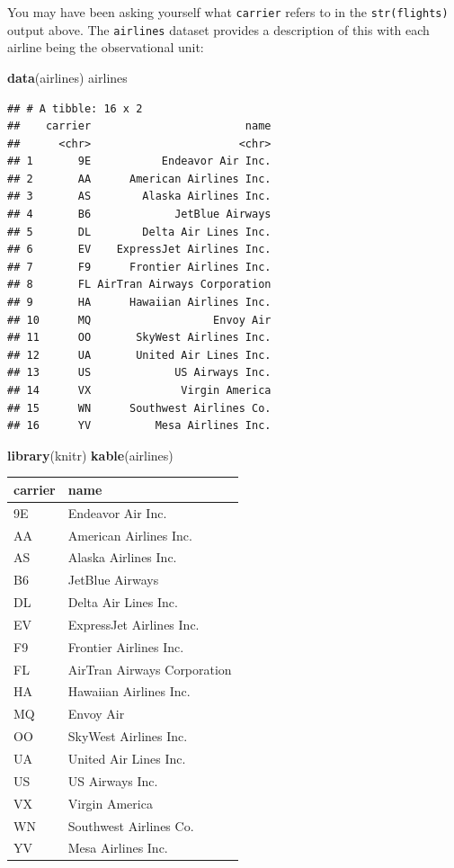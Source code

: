 \documentclass[]{tufte-book}
\newenvironment{Shaded}{\begin{snugshade}}{\end{snugshade}}
\newcommand{\KeywordTok}[1]{\textcolor[rgb]{0.13,0.29,0.53}{\textbf{{#1}}}}
\newcommand{\NormalTok}[1]{{#1}}
\begin{document}
You may have been asking yourself what \texttt{carrier} refers to in the
\texttt{str(flights)} output above. The \texttt{airlines} dataset
provides a description of this with each airline being the observational
unit:

\begin{Shaded}
\begin{Highlighting}[]
\KeywordTok{data}\NormalTok{(airlines)}
\NormalTok{airlines}
\end{Highlighting}
\end{Shaded}

\begin{verbatim}
## # A tibble: 16 x 2
##    carrier                        name
##      <chr>                       <chr>
## 1       9E           Endeavor Air Inc.
## 2       AA      American Airlines Inc.
## 3       AS        Alaska Airlines Inc.
## 4       B6             JetBlue Airways
## 5       DL        Delta Air Lines Inc.
## 6       EV    ExpressJet Airlines Inc.
## 7       F9      Frontier Airlines Inc.
## 8       FL AirTran Airways Corporation
## 9       HA      Hawaiian Airlines Inc.
## 10      MQ                   Envoy Air
## 11      OO       SkyWest Airlines Inc.
## 12      UA       United Air Lines Inc.
## 13      US             US Airways Inc.
## 14      VX              Virgin America
## 15      WN      Southwest Airlines Co.
## 16      YV          Mesa Airlines Inc.
\end{verbatim}

\begin{Shaded}
\begin{Highlighting}[]
\KeywordTok{library}\NormalTok{(knitr)}
\KeywordTok{kable}\NormalTok{(airlines)}
\end{Highlighting}
\end{Shaded}

\begin{tabular}{l|l}
\hline
carrier & name\\
\hline
9E & Endeavor Air Inc.\\
\hline
AA & American Airlines Inc.\\
\hline
AS & Alaska Airlines Inc.\\
\hline
B6 & JetBlue Airways\\
\hline
DL & Delta Air Lines Inc.\\
\hline
EV & ExpressJet Airlines Inc.\\
\hline
F9 & Frontier Airlines Inc.\\
\hline
FL & AirTran Airways Corporation\\
\hline
HA & Hawaiian Airlines Inc.\\
\hline
MQ & Envoy Air\\
\hline
OO & SkyWest Airlines Inc.\\
\hline
UA & United Air Lines Inc.\\
\hline
US & US Airways Inc.\\
\hline
VX & Virgin America\\
\hline
WN & Southwest Airlines Co.\\
\hline
YV & Mesa Airlines Inc.\\
\hline
\end{tabular}
\end{document}
